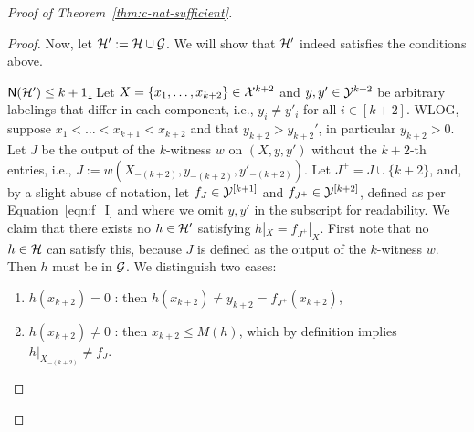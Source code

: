 \documentclass[11pt]{article}
\begin{document}
\begin{proof}[Proof of Theorem~\ref{thm:c-nat-sufficient}]
\begin{proof}
    Now, let $\mathcal{H}':=\mathcal{H}\cup\mathcal{G}$. We will show that $\mathcal{H}'$ indeed satisfies the conditions above.

    \underline{$\mathsf{N}(\mathcal{H}')\leq k+1$.} 
    Let $X=\{x_1,\dots,x_{k+2}\}\in\mathcal{X}^{k+2}$ and $y,y'\in\mathcal{Y}^{k+2}$ be arbitrary labelings that differ in each component, i.e., $y_i\neq y'_i$ for all $i\in[k+2]$.
    WLOG, suppose $x_1<\dots<x_{k+1}<x_{k+2}$ and that $y_{k+2}>y_{k+2}'$, in particular $y_{k+2} >0$.
    Let $J$ be the output of the $k$-witness $w$ on $(X,y,y')$ without the $k+2$-th entries, i.e., $J:=w(X_{-(k+2)},y_{-(k+2)},y'_{-(k+2)})$.
    Let $J^+=J\cup\{k+2\}$, and, by a slight abuse of notation, let $f_J\in\mathcal{Y}^{[k+1]}$ and $f_{J^+}\in\mathcal{Y}^{[k+2]}$, defined as per Equation~\ref{eqn:f_I} and where we omit $y,y'$ in the subscript for readability.
    We claim that there exists no $h\in\mathcal{H}'$ satisfying $h|_X=f_{J^+}|_X$.
    First note that no $h\in\mathcal{H}$ can satisfy this, because $J$ is defined as the output of the $k$-witness $w$.
    Then $h$ must be in $\mathcal{G}$.
    We distinguish two cases:
    \begin{enumerate}
        \item $h(x_{k+2})=0$ : then $h(x_{k+2})\neq y_{k+2}=f_{J^+}(x_{k+2})$,
        \item $h(x_{k+2})\neq 0$ : then $x_{k+2}\leq M(h)$, which by definition implies $h|_{X_{-(k+2)}}\neq f_J$.
    \end{enumerate}
    

\end{proof}
\end{proof}
\end{document}
